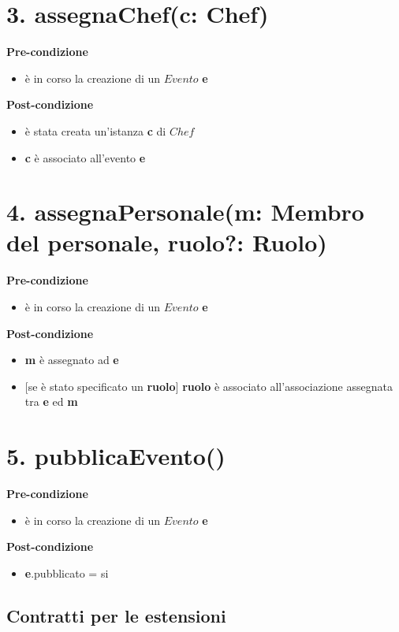 \documentclass[12pt]{extarticle}
\begin{document}
 

\section*{3. assegnaChef(c: Chef)}

\textbf{Pre-condizione}
\begin{itemize}
  \item è in corso la creazione di un $Evento$ \textbf{e}
\end{itemize}
\textbf{Post-condizione}
\begin{itemize}
  \item è stata creata un'istanza \textbf{c} di  $Chef$
  \item \textbf{c} è associato all'evento \textbf{e}
\end{itemize}

 

\section*{4. assegnaPersonale(m: Membro del personale, ruolo?: Ruolo)}

\textbf{Pre-condizione}
\begin{itemize}
  \item è in corso la creazione di un $Evento$ \textbf{e}
\end{itemize}
\textbf{Post-condizione}
\begin{itemize}
  \item \textbf{m} è assegnato ad \textbf{e}
  \item $[$se è stato specificato un \textbf{ruolo}$]$ \textbf{ruolo} è associato all'associazione assegnata tra \textbf{e} ed \textbf{m}
\end{itemize} 


\section*{5. pubblicaEvento()}
\textbf{Pre-condizione}
\begin{itemize}
  \item è in corso la creazione di un $Evento$ \textbf{e}
\end{itemize}
\textbf{Post-condizione}
\begin{itemize}
    \item \textbf{e}.pubblicato = si
\end{itemize}

\newpage
\begin{center}
  \section*{Contratti per le estensioni}
\end{center}
\end{document}
